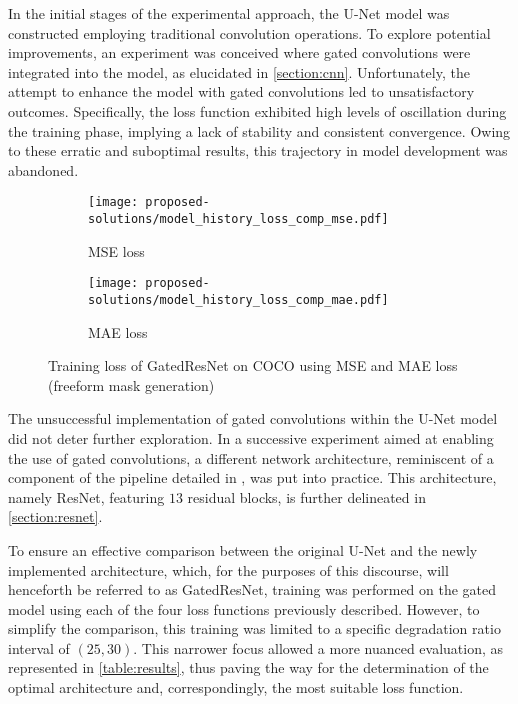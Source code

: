 In the initial stages of the experimental approach, the U-Net model was constructed employing traditional convolution operations. To explore potential improvements, an experiment was conceived where gated convolutions were integrated into the model, as elucidated in \autoref{section:cnn}. Unfortunately, the attempt to enhance the model with gated convolutions led to unsatisfactory outcomes. Specifically, the loss function exhibited high levels of oscillation during the training phase, implying a lack of stability and consistent convergence. Owing to these erratic and suboptimal results, this trajectory in model development was abandoned.
\begin{figure}[ht]
    \centering
    \captionsetup[subfigure]{justification=centering}
    \begin{subfigure}[ht]{0.49\textwidth}
        \centering
        \texttt{[image: proposed-solutions/model\_history\_loss\_comp\_mse.pdf]}
        \caption{MSE loss}
        \label{fig:loss_comp_mse}
    \end{subfigure}
    \hspace*{\fill}
    \begin{subfigure}[ht]{0.49\textwidth}
        \centering
        \texttt{[image: proposed-solutions/model\_history\_loss\_comp\_mae.pdf]}
        \caption{MAE loss}
        \label{fig:loss_comp_mae}
    \end{subfigure}
    \caption[Training loss of GatedResNet on COCO using MSE and MAE loss]{Training loss of GatedResNet on COCO using MSE and MAE loss\\(freeform mask generation)}
    \label{fig:train_metrics_comp}
\end{figure}

The unsuccessful implementation of gated convolutions within the U-Net model did not deter further exploration. In a successive experiment aimed at enabling the use of gated convolutions, a different network architecture, reminiscent of a component of the pipeline detailed in \cite{free-form-inpainting}, was put into practice. This architecture, namely ResNet, featuring $13$ residual blocks, is further delineated in \autoref{section:resnet}.

To ensure an effective comparison between the original U-Net and the newly implemented architecture, which, for the purposes of this discourse, will henceforth be referred to as GatedResNet, training was performed on the gated model using each of the four loss functions previously described. However, to simplify the comparison, this training was limited to a specific degradation ratio interval of $(25, 30)$. This narrower focus allowed a more nuanced evaluation, as represented in \autoref{table:results}, thus paving the way for the determination of the optimal architecture and, correspondingly, the most suitable loss function.

